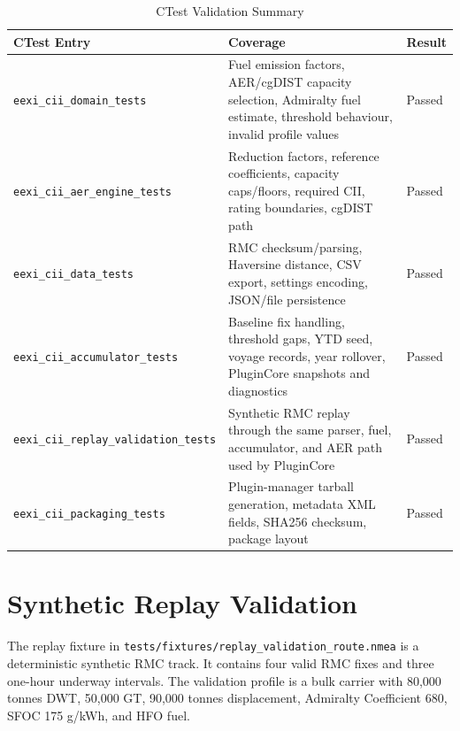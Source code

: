 \begin{table}[H]
    \centering
    \small
    \caption{CTest Validation Summary}
    \label{tab:ctest-summary}
    \begin{tabularx}{\textwidth}{lXX}
        \toprule
        \textbf{CTest Entry} & \textbf{Coverage} & \textbf{Result} \\
        \midrule
        \texttt{eexi\_cii\_domain\_tests} & Fuel emission factors, AER/cgDIST capacity selection, Admiralty fuel estimate, threshold behaviour, invalid profile values & Passed \\
        \texttt{eexi\_cii\_aer\_engine\_tests} & Reduction factors, reference coefficients, capacity caps/floors, required CII, rating boundaries, cgDIST path & Passed \\
        \texttt{eexi\_cii\_data\_tests} & RMC checksum/parsing, Haversine distance, CSV export, settings encoding, JSON/file persistence & Passed \\
        \texttt{eexi\_cii\_accumulator\_tests} & Baseline fix handling, threshold gaps, YTD seed, voyage records, year rollover, PluginCore snapshots and diagnostics & Passed \\
        \texttt{eexi\_cii\_replay\_validation\_tests} & Synthetic RMC replay through the same parser, fuel, accumulator, and AER path used by PluginCore & Passed \\
        \texttt{eexi\_cii\_packaging\_tests} & Plugin-manager tarball generation, metadata XML fields, SHA256 checksum, package layout & Passed \\
        \bottomrule
    \end{tabularx}
\end{table}

\section{Synthetic Replay Validation}
The replay fixture in \texttt{tests/fixtures/replay\_validation\_route.nmea} is a deterministic synthetic RMC track. It contains four valid RMC fixes and three one-hour underway intervals. The validation profile is a bulk carrier with 80,000 tonnes DWT, 50,000 GT, 90,000 tonnes displacement, Admiralty Coefficient 680, SFOC 175 g/kWh, and HFO fuel.

